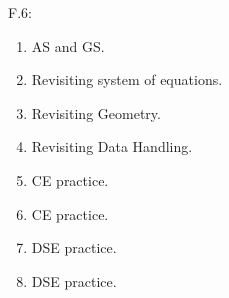 \documentclass{article}
\begin{document}
    \noindent F.6:\begin{enumerate}
        \item AS and GS.
        \item Revisiting system of equations.
        \item Revisiting Geometry.
        \item Revisiting Data Handling.
        \item CE practice.
        \item CE practice.
        \item DSE practice.
        \item DSE practice.
    \end{enumerate}
\end{document}
